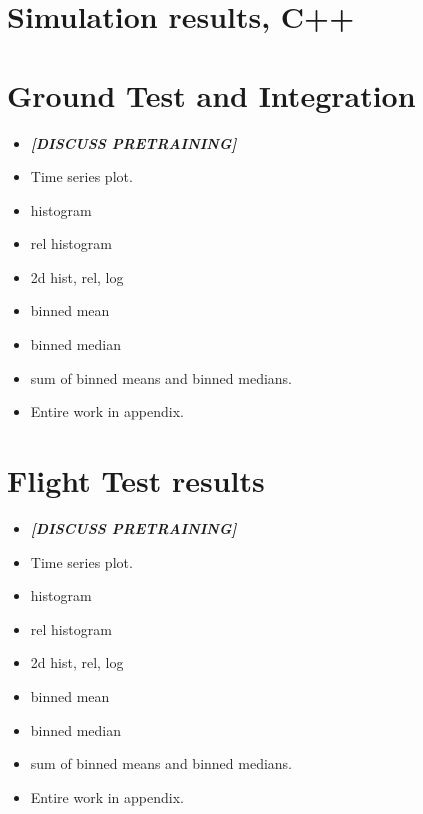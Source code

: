 \section{Simulation results, C++}
\section{Ground Test and Integration}
\begin{itemize}
	\item \textbf{\textit{[DISCUSS PRETRAINING]}}
	\item Time series plot.
	\item histogram
	\item rel histogram
	\item 2d hist, rel, log
	\item binned mean
	\item binned median
	\item sum of binned means and binned medians.
	\item Entire work in appendix.
\end{itemize}

\section{Flight Test results}

\begin{itemize}
	\item \textbf{\textit{[DISCUSS PRETRAINING]}}
	\item Time series plot.
	\item histogram
	\item rel histogram
	\item 2d hist, rel, log
	\item binned mean
	\item binned median
	\item sum of binned means and binned medians.
	\item Entire work in appendix.
\end{itemize}